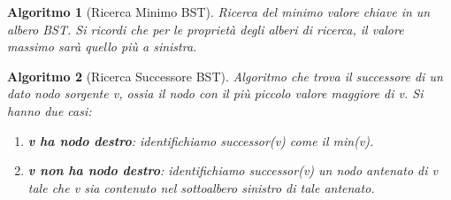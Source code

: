 \documentclass[oneside]{book}
\newtheorem{alg}{Algoritmo}
\begin{document}
\begin{alg}[Ricerca Minimo BST]
  Ricerca del minimo valore chiave in un albero BST. Si ricordi che per le
  propriet\`a degli alberi di ricerca, il valore massimo sar\`a quello pi\`u a sinistra.

  \begin{algorithm}[H]

  \end{algorithm}
\end{alg}

\begin{alg}[Ricerca Successore BST]
  Algoritmo che trova il successore di un dato nodo sorgente \emph{v}, ossia il
  nodo con il pi\`u piccolo valore maggiore di \emph{v}. Si hanno due casi:
  \begin{enumerate}
    \item \textbf{\emph{v} ha nodo destro}: identifichiamo \emph{successor(v)} come
      il \emph{min(v)}.
    \item \textbf{\emph{v} non ha nodo destro}: identifichiamo \emph{successor(v)}
      un nodo antenato di \emph{v} tale che \emph{v} sia contenuto nel sottoalbero
      sinistro di tale antenato.
  \end{enumerate}

  \begin{algorithm}[H]

  \end{algorithm}
\end{alg}
\end{document}
